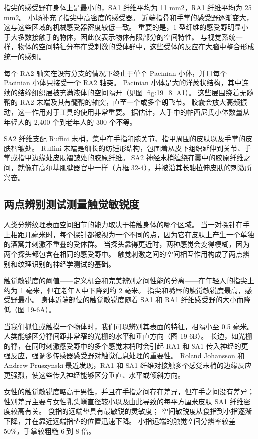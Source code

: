 指尖的感受野在身体上是最小的，SA1 纤维平均为 11 mm2，RA1 纤维平均为 25 mm2。 
小场补充了指尖中高密度的感受器。 
近端指骨和手掌的感受野逐渐变大，这与这些区域的机械感受器密度较低一致。 
重要的是，1 型纤维的感受野明显小于大多数接触手的物体，因此仅表示物体有限部分的空间特性。 
与视觉系统一样，物体的空间特征分布在受刺激的受体群中，这些受体的反应在大脑中整合形成统一的感知。


每个 RA2 轴突在没有分支的情况下终止于单个 Pacinian 小体，并且每个 Pacinian 小体只接受一个 RA2 轴突。 
Pacinian 小体是大的洋葱状结构，其中连续的结缔组织层被充满液体的空间隔开（见图 \ref{fig:19_8} A1）。 
这些层围绕着无髓鞘的 RA2 末端及其有髓鞘的轴突，直至一个或多个朗飞节。 
胶囊会放大高频振动，这一作用对于工具的使用非常重要。 
据估计，人手中的帕西尼氏小体数量从年轻人的 2,400 个到老年人的 300 个不等。


SA2 纤维支配 Ruffini 末梢，集中在手指和腕关节、指甲周围的皮肤以及手掌的皮肤褶皱处。 
Ruffini 末端是细长的纺锤形结构，包围着从皮下组织延伸到关节、手掌或指甲边缘处皮肤褶皱处的胶原纤维。 
SA2 神经末梢缠绕在囊中的胶原纤维之间，就像在高尔基肌腱器官中一样（方框 32-4），并被沿其长轴拉伸皮肤的刺激所兴奋。


\subsection{两点辨别测试测量触觉敏锐度}
人类分辨纹理表面空间细节的能力取决于接触身体的哪个区域。 
当一对探针在手上相距几毫米时，每个探针都被视为一个不同的点，因为它在皮肤上产生一个单独的酒窝并刺激不重叠的受体群。 当探头靠得更近时，两种感觉会变得模糊，因为两个探头都包含在相同的感受野中。 触觉刺激之间的空间相互作用构成了两点辨别和纹理识别的神经学测试的基础。

触觉敏锐度的阈值——定义机会和完美辨别之间性能的分离——在年轻人的指尖上约为 1 毫米，但在老年人中下降到约 2 毫米。 指尖和嘴唇的触觉敏锐度最高，感受野最小。 身体近端部位的触觉敏锐度随着 SA1 和 RA1 纤维感受野的大小而降低（图 19-6A）。

当我们抓住或触摸一个物体时，我们可以辨别其表面的特征，相隔小至 0.5 毫米。 人类能够区分脊间距非常窄的光栅的水平和垂直方向（图 19-6B）。 长边，如光栅的脊，在同时刺激感受野中的多个感觉末梢时会引起 RA1 和 SA1 传入神经的更强反应，强调多传感器感受野对触觉信息处理的重要性。 Roland Johansson 和 Andrew Pruszynski 最近发现，RA1 和 SA1 纤维对接触多个感觉末梢的边缘反应更强烈，使这些传入神经能够区分垂直、水平或倾斜方向。

女性的触觉敏锐度略高于男性，并且在手指之间存在差异，但在手之间没有差异； 性别差异主要与女性乳头嵴直径较小以及由此导致的每平方厘米皮肤 SA1 纤维密度较高有关。 食指的远端垫具有最敏锐的灵敏度； 空间敏锐度从食指到小指逐渐下降，并在靠近远端指垫的位置迅速下降。 小指远端的触觉空间分辨率较差 50\%，手掌较粗糙 6 到 8 倍。

